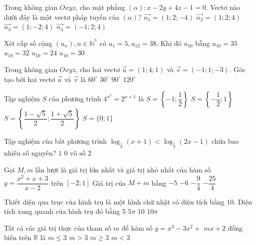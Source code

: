 \begin{ex}%
Trong không gian $O x y z$, cho mặt phẳng $(\alpha)\colon x-2 y+4 z-1=0$. Vectơ nào dưới đây là một vectơ pháp tuyến của $(\alpha)$?
\choice
{$\overrightarrow{n_1}=(1; 2;-4)$}
{$\overrightarrow{n_2}=(1; 2; 4)$}
{\True $\overrightarrow{n_3}=(1;-2; 4)$}
{$\overrightarrow{n_4}=(-1; 2; 4)$}

\end{ex}
\begin{ex}%
Xét cấp số cộng $\left(u_n\right), n \in \mathbb{N}^{*}$ có $u_1=5, u_{12}=38$. Khi đó $u_{10}$ bẵng
\choice
{$u_{10}=35$}
{\True $u_{10}=32$}
{$u_{10}=24$}
{$u_{10}=30$}

\end{ex}
\begin{ex}%
Trong không gian $O x y z$, cho hai vectơ $\vec{u}=(1; 4; 1)$ và $\vec{v}=(-1; 1;-3)$. Góc tạo bởi hai vectơ $\vec{u}$ và $\vec{v}$ là
\choice
{$60^{\circ}$}
{$30^{\circ}$}
{\True $90^{\circ}$}
{$120^{\circ}$}

\end{ex}
\begin{ex}%
Tập nghiệm $S$ của phương trình $4^{x^2}=2^{x+1}$ là
\choice
{$S=\left\{-1; \dfrac{1}{2}\right\}$}
{\True $S=\left\{-\dfrac{1}{2}; 1\right\}$}
{$S=\left\{\dfrac{1-\sqrt{5}}{2}; \dfrac{1+\sqrt{5}}{2}\right\}$}
{$S=\{0; 1\}$}

\end{ex}
\begin{ex}%
Tập nghiệm của bất phương trình $\log_{\frac{1}{2}}(x+1)<\log_{\frac{1}{2}}(2 x-1)$ chứa bao nhiêu số nguyên?
\choice
{\True $1$}
{$0$}
{$\text{vô số}$}
{$2$}

\end{ex}
\begin{ex}%
Gọi $M, m$ lần lượt là giá trị lớn nhất và giá trị nhỏ nhất của hàm số $y=\dfrac{x^2+x+3}{x-2}$ trên $[-2; 1]$ Giá trị của $M+m$ bằng
\choice
{$-5$}
{\True $-6$}
{$-\dfrac{9}{4}$}
{$-\dfrac{25}{4}$}

\end{ex}
\begin{ex}%
Thiết diện qua trục của hình trụ là một hình chữ nhật có diện tích bằng $10$. Diện tích xung quanh của hình trụ đó bằng
\choice
{$5$}
{$5\pi$}
{$10$}
{\True $10\pi$}

\end{ex}
\begin{ex}%
Tất cả các giá trị thực của tham số $m$ để hàm số $y=x^3-3 x^2+$ $m x+2$ đồng biến trên $\mathbb{R}$ là
\choice
{$m \leq 3$}
{$m>3$}
{\True $m \geq 3$}
{$m<3$}

\end{ex}
